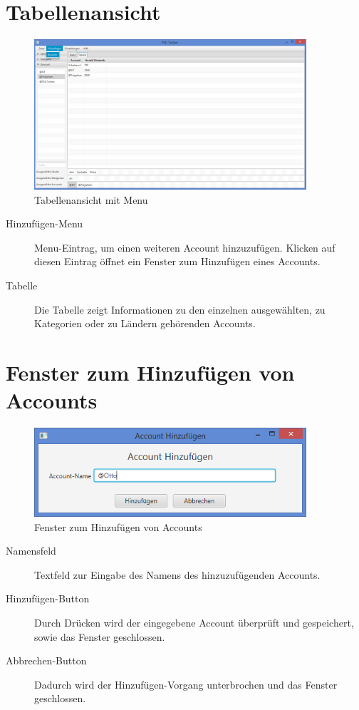 \section{Tabellenansicht}

\begin{figure}[h]
	\centering
	\includegraphics[width=0.9\textwidth]{img/DemoGUITabelleAddAccount.png}
	\caption{Tabellenansicht mit Menu}
	\label{c:Tabellenansicht mit Menu}
\end{figure}

\begin{description}
	\item[Hinzufügen-Menu] Menu-Eintrag, um einen weiteren Account hinzuzufügen. Klicken auf diesen Eintrag öffnet ein Fenster zum Hinzufügen eines Accounts.
	\item[Tabelle] Die Tabelle zeigt Informationen zu den einzelnen ausgewählten, zu Kategorien oder zu Ländern gehörenden Accounts.
\end{description}

\section{Fenster zum Hinzufügen von Accounts}

\begin{figure}[h]
	\centering
	\includegraphics[width=0.9\textwidth]{img/DemoGUIAddAccount.png}
	\caption{Fenster zum Hinzufügen von Accounts}
	\label{c:Fenster zum Hinzufügen von Accounts}
\end{figure}

\begin{description}
	\item[Namensfeld] Textfeld zur Eingabe des Namens des hinzuzufügenden Accounts.
	\item[Hinzufügen-Button] Durch Drücken wird der eingegebene Account überprüft und gespeichert, sowie das Fenster geschlossen.
	\item[Abbrechen-Button] Dadurch wird der Hinzufügen-Vorgang unterbrochen und das Fenster geschlossen.
\end{description}
